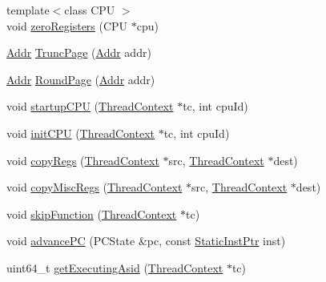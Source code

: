 \begin{DoxyCompactItemize}
\item 
{\footnotesize template$<$class CPU $>$ }\\void \hyperlink{namespaceMipsISA_a2f96efaaa88b587ab5b29ded7264960e}{zeroRegisters} (CPU $\ast$cpu)
\item 
\hyperlink{base_2types_8hh_af1bb03d6a4ee096394a6749f0a169232}{Addr} \hyperlink{namespaceMipsISA_afef87a2ebf00c4afe79598bf404860c7}{TruncPage} (\hyperlink{base_2types_8hh_af1bb03d6a4ee096394a6749f0a169232}{Addr} addr)
\item 
\hyperlink{base_2types_8hh_af1bb03d6a4ee096394a6749f0a169232}{Addr} \hyperlink{namespaceMipsISA_a3cf1a9ff2ed57d6ae150519212096c13}{RoundPage} (\hyperlink{base_2types_8hh_af1bb03d6a4ee096394a6749f0a169232}{Addr} addr)
\item 
void \hyperlink{namespaceMipsISA_a343e9193078845bb700799b0c7f24d2a}{startupCPU} (\hyperlink{classThreadContext}{ThreadContext} $\ast$tc, int cpuId)
\item 
void \hyperlink{namespaceMipsISA_aded557a1e716c6f849b0e0b05fc77676}{initCPU} (\hyperlink{classThreadContext}{ThreadContext} $\ast$tc, int cpuId)
\item 
void \hyperlink{namespaceMipsISA_aaeffcccf262b0dbd3cbcc8b4cef41168}{copyRegs} (\hyperlink{classThreadContext}{ThreadContext} $\ast$src, \hyperlink{classThreadContext}{ThreadContext} $\ast$dest)
\item 
void \hyperlink{namespaceMipsISA_a42833096094e5ff0f2de948bf8e5965c}{copyMiscRegs} (\hyperlink{classThreadContext}{ThreadContext} $\ast$src, \hyperlink{classThreadContext}{ThreadContext} $\ast$dest)
\item 
void \hyperlink{namespaceMipsISA_a2624d7d8bac3eb03de2eb6e83903c208}{skipFunction} (\hyperlink{classThreadContext}{ThreadContext} $\ast$tc)
\item 
void \hyperlink{namespaceMipsISA_a8029c9215d2beac3c8658dd94e492b7e}{advancePC} (PCState \&pc, const \hyperlink{classRefCountingPtr}{StaticInstPtr} inst)
\item 
uint64\_\-t \hyperlink{namespaceMipsISA_ada6b2a9f08bac266b15f41ee721aca4b}{getExecutingAsid} (\hyperlink{classThreadContext}{ThreadContext} $\ast$tc)
\end{DoxyCompactItemize}
